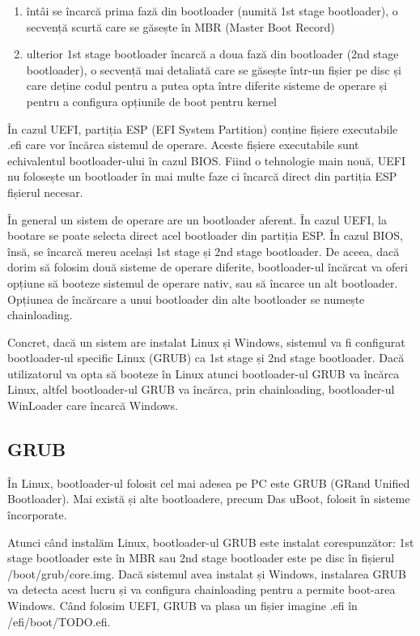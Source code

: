 \begin{enumerate}
	\item întâi se încarcă prima fază din bootloader (numită 1st stage
		bootloader), o secvență scurtă care se găsește în MBR (Master
		Boot Record)
	\item ulterior 1st stage bootloader încarcă a doua fază din bootloader
		(2nd stage bootloader), o secvență mai detaliată care se găsește
		într-un fișier pe disc și care deține codul pentru a putea opta
		între diferite sisteme de operare și pentru a configura
		opțiunile de boot pentru kernel
\end{enumerate}

În cazul UEFI, partiția ESP (EFI System Partition) conține fișiere executabile
.efi care vor încărca sistemul de operare. Aceste fișiere executabile sunt
echivalentul bootloader-ului în cazul BIOS. Fiind o tehnologie main nouă, UEFI
nu folosește un bootloader în mai multe faze ci încarcă direct din partiția ESP
fișierul necesar.

În general un sistem de operare are un bootloader aferent. În cazul UEFI, la
bootare se poate selecta direct acel bootloader din partiția ESP. În cazul BIOS,
însă, se încarcă mereu același 1st stage și 2nd stage bootloader. De aceea, dacă
dorim să folosim două sisteme de operare diferite, bootloader-ul încărcat va
oferi opțiune să booteze sistemul de operare nativ, sau să încarce un alt
bootloader. Opțiunea de încărcare a unui bootloader din alte bootloader se
numește chainloading.

Concret, dacă un sistem are instalat Linux și Windows, sistemul va fi configurat
bootloader-ul specific Linux (GRUB) ca 1st stage și 2nd stage bootloader. Dacă
utilizatorul va opta să booteze în Linux atunci bootloader-ul GRUB va încărca
Linux, altfel bootloader-ul GRUB va încărca, prin chainloading, bootloader-ul
WinLoader care încarcă Windows.

\subsection{GRUB}
\label{sec:boot-bootloader-grub}

În Linux, bootloader-ul folosit cel mai adesea pe PC este GRUB (GRand Unified
Bootloader). Mai există și alte bootloadere, precum Das uBoot, folosit în
sisteme încorporate.

Atunci când instalăm Linux, bootloader-ul GRUB este instalat corespunzător: 1st
stage bootloader este în MBR sau 2nd stage bootloader este pe disc în fișierul
/boot/grub/core.img. Dacă sistemul avea instalat și Windows, instalarea GRUB va
detecta acest lucru și va configura chainloading pentru a permite boot-area
Windows. Când folosim UEFI, GRUB va plasa un fișier imagine .efi în
/efi/boot/TODO.efi.


